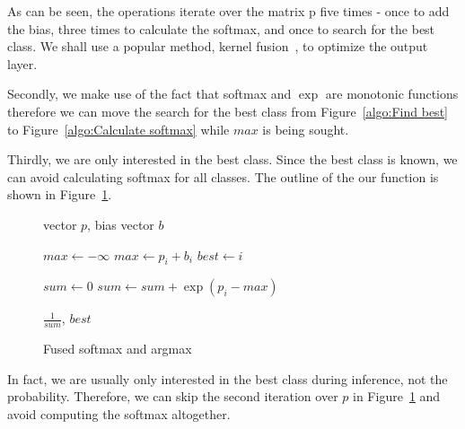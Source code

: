 \documentclass[11pt,a4paper]{article}
\begin{document}
As can be seen, the operations iterate over the matrix p five times - once to add the bias, three times to calculate the softmax, and once to search for the best class. We shall use a popular method, kernel fusion~\citep{Guevara2009EnablingTP}, to optimize the output layer.

Secondly, we make use of the fact that softmax and $\exp$ are monotonic functions therefore we can move the search for the best class from Figure~\ref{algo:Find best} to Figure~\ref{algo:Calculate softmax} while $max$ is being sought.

Thirdly, we are only interested in the best class. Since the best class is known, we can avoid calculating softmax for all classes. The outline of the our function is shown in Figure~\ref{algo:Fused Kernel}.

\begin{figure} [h]
\begin{algorithmic}
\REQUIRE vector $p$, bias vector $b$


\STATE $max \gets - \infty$ 
    \STATE $max \gets p_i + b_i$
    \STATE $best \gets i$
  \ENDIF
\ENDFOR 


\STATE $sum \gets 0$ 
    \STATE $sum \gets sum + \exp(p_i - max)$
  \ENDIF
\ENDFOR 

\RETURN $\frac{1}{sum}$, $best$ 


\end{algorithmic}
\caption{Fused softmax and argmax}
\label{algo:Fused Kernel}
\end{figure}


In fact, we are usually only interested in the best class during inference, not the probability. Therefore, we can skip the second iteration over $p$ in Figure~\ref{algo:Fused Kernel} and avoid computing the softmax altogether. %

% 
% 
% 
% 
\end{document}
